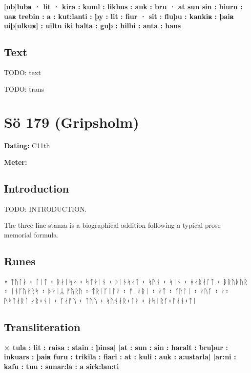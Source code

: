 \textbf{[ub]lubʀ · lit · kira : kuml : likhus : auk : bru · at sun sin : biurn : uaʀ trebin : a : kut:lanti : þy : lit : fiur · sit : fluþu : kankiʀ : þaiʀ uiþ[ulkuʀ] : uiltu iki halta : guþ : hilbi : anta : hans}

\subsection{Text}

\bpg\bpa[0]%
TODO: text\epa

\bpb TODO: trans\epb\epg

\sectionline\clearpage


\section{Sö 179 (Gripsholm)}

\begin{flushright}%
\textbf{Dating:} C11th

\textbf{Meter:} \Fornyrdislag
\end{flushright}%

\subsection{Introduction}

TODO: INTRODUCTION.

The three-line stanza is a biographical addition following a typical prose memorial formula.


\subsection{Runes}

᛭ ᛏᚢᛚᛅ ᛬ ᛚᛁᛏ ᛬ ᚱᛅᛁᛋᛅ ᛬ ᛋᛏᛅᛁᚾ ᛬ ᚦᛁᚾᛋᛅᛏ ᛬ ᛋᚢᚾ ᛬ ᛋᛁᚾ ᛬ ᚼᛅᚱᛅᛚᛏ ᛬ ᛒᚱᚢᚦᚢᚱ ᛬ ᛁᚾᚴᚢᛅᚱᛋ ᛬ ᚦᛅᛁᛦ ᚠᚢᚱᚢ ᛬ ᛏᚱᛁᚴᛁᛚᛅ ᛬ ᚠᛁᛅᚱᛁ ᛬ ᛅᛏ ᛬ ᚴᚢᛚᛁ ᛬ ᛅᚢᚴ ᛬ ᛅ᛬ᚢᛋᛏᛅᚱᛚ ᛅᚱ᛬ᚾᛁ ᛬ ᚴᛅᚠᚢ ᛬ ᛏᚢᚢ ᛬ ᛋᚢᚾᛅᚱ᛬ᛚᛅ ᛬ ᛅᛋᛁᚱᚴ᛬ᛚᛅᚾ᛬ᛏᛁ%

\subsection{Transliteration}

\textbf{× tula : lit : raisa : stain : þinsa| |at : sun : sin : haralt : bruþur : inkuars : þaiʀ furu : trikila : fiari : at : kuli : auk : a:ustarla| |ar:ni : kafu : tuu : sunar:la : a sirk:lan:ti}

